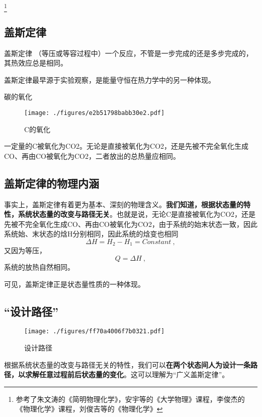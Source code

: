 

\footnote{参考了朱文涛的《简明物理化学》，安宇等的《大学物理》课程，李俊杰的《物理化学》课程，刘俊吉等的《物理化学》}

\subsection{盖斯定律}
\begin{theorem}{盖斯定律}
（等压或等容过程中）一个反应，不管是一步完成的还是多步完成的，其热效应总是相同。
\end{theorem}
盖斯定律最早源于实验观察，是能量守恒在热力学中的另一种体现。

\begin{example}{碳的氧化}
\begin{figure}[ht]
\centering
\texttt{[image: ./figures/e2b51798babb30e2.pdf]}
\caption{C的氧化} \label{fig_Hess_2}
\end{figure}
一定量的C被氧化为CO2。无论是直接被氧化为CO2，还是先被不完全氧化生成CO、再由CO被氧化为CO2，二者放出的总热量应相同。
\end{example}

\subsection{盖斯定律的物理内涵}
事实上，盖斯定律有着更为基本、深刻的物理含义。\textbf{我们知道，根据状态量的特性，系统状态量的改变与路径无关}。也就是说，无论C是直接被氧化为CO2，还是先被不完全氧化生成CO、再由CO被氧化为CO2，由于系统的始末状态一致，因此系统始、末状态的焓H分别相同，因此系统的焓变也相同$$\Delta H=H_2-H_1=Constant~,$$又因为等压，$$Q=\Delta H~,$$系统的放热自然相同。

可见，盖斯定律正是状态量性质的一种体现。

\subsection{“设计路径”}
\begin{figure}[ht]
\centering
\texttt{[image: ./figures/ff70a4006f7b0321.pdf]}
\caption{设计路径} \label{fig_Hess_1}
\end{figure}

根据系统状态量的改变与路径无关的特性，我们可以\textbf{在两个状态间人为设计一条路径，以求解任意过程前后状态量的变化}。这可以理解为“广义盖斯定律”。

